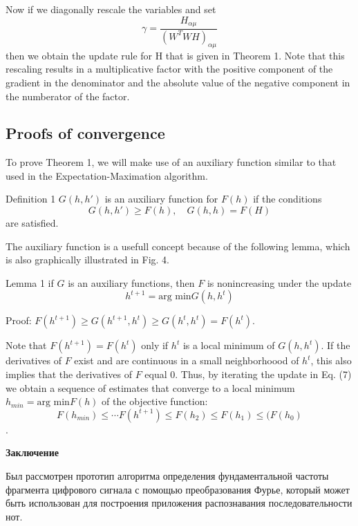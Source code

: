 \documentclass[oneside, final, 14pt]{extarticle}
\begin{document}
Now if we diagonally rescale the variables and set
\begin{equation}
  \gamma = \frac{H_{\alpha\mu}}{(W^TWH)_{\alpha\mu}}
\end{equation}
then we obtain the update rule for H that is given in Theorem 1.
Note that this rescaling results in a multiplicative factor with
the positive component of the gradient in the denominator
and the absolute value of the negative component in the numberator
of the factor.

\subsection{Proofs of convergence}
To prove Theorem 1, we will make use of an auxiliary function
similar to that used in the Expectation-Maximation algorithm.

Definition 1 $G(h, h')$ is an auxiliary function for $F(h)$ if the
conditions
\begin{equation}
  G(h,h') \geqslant F(h), \quad G(h,h) = F(H)
\end{equation}
are satisfied.

The auxiliary function is a usefull concept because of the following
lemma, which is also graphically illustrated in Fig. 4.

Lemma 1 if $G$ is an auxiliary functions, then $F$ is nonincreasing
under the update
\begin{equation}
  h^{t+1} = \text{arg min} G(h, h^t)
\end{equation}

Proof: $F(h^{t+1}) \geqslant G(h^{t+1},h^t) \geqslant G(h^t, h^t)
= F(h^t)$.

Note that $F(h^{t+1}) = F(h^t)$ only if $h^t$ is a local minimum of
$G(h,h^t)$. If the derivatives of $F$ exist and are continuous in
a small neighborhoood of $h^t$, this also implies that
the derivatives of $F$ equal 0. Thus, by iterating the update in
Eq. (7) we obtain a sequence of estimates that converge to a local
minimum $h_{min} = \text{arg min} F(h)$ of the objective function:
\begin{equation}
  F(h_{min}) \leqslant \cdots F(h^{t+1}) \leqslant F(h_2)
  \leqslant F(h_1) \leqslant (F(h_0)
\end{equation}.

\cleardoublepage

{\large \bf Заключение \\}
  Был рассмотрен прототип алгоритма определения фундаментальной частоты фрагмента
  цифрового сигнала с помощью преобразования Фурье, который может быть
  использован для построения приложения распознавания последовательности нот.
\end{document}
